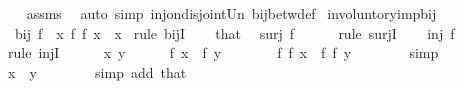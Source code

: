 \begin{isabellebody}
%
\isadelimproof
\ \ %
\endisadelimproof
%
\isatagproof
{}\isamarkupfalse%
\ assms\ \isamarkupfalse%
\ {\isacharparenleft}{\kern0pt}auto\ simp{\isacharcolon}{\kern0pt}\ inj{\isacharunderscore}{\kern0pt}on{\isacharunderscore}{\kern0pt}disjoint{\isacharunderscore}{\kern0pt}Un\ bij{\isacharunderscore}{\kern0pt}betw{\isacharunderscore}{\kern0pt}def{\isacharparenright}{\kern0pt}%
\endisatagproof
{\isafoldproof}%
%
\isadelimproof
\isanewline
%
\endisadelimproof
\isanewline
{}\isamarkupfalse%
\ involuntory{\isacharunderscore}{\kern0pt}imp{\isacharunderscore}{\kern0pt}bij{\isacharcolon}{\kern0pt}\isanewline
\ \ {\isacartoucheopen}bij\ f{\isacartoucheclose}\ \ {\isacartoucheopen}{\isasymAnd}x{\isachardot}{\kern0pt}\ f\ {\isacharparenleft}{\kern0pt}f\ x{\isacharparenright}{\kern0pt}\ {\isacharequal}{\kern0pt}\ x{\isacartoucheclose}\isanewline
%
\isadelimproof
%
\endisadelimproof
%
\isatagproof
{}\isamarkupfalse%
\ {\isacharparenleft}{\kern0pt}rule\ bijI{\isacharparenright}{\kern0pt}\isanewline
\ \ \isamarkupfalse%
\ that\ \isamarkupfalse%
\ {\isacartoucheopen}surj\ f{\isacartoucheclose}\isanewline
\ \ \ \ \isamarkupfalse%
\ {\isacharparenleft}{\kern0pt}rule\ surjI{\isacharparenright}{\kern0pt}\isanewline
\ \ \isamarkupfalse%
\ {\isacartoucheopen}inj\ f{\isacartoucheclose}\isanewline
\ \ \isamarkupfalse%
\ {\isacharparenleft}{\kern0pt}rule\ injI{\isacharparenright}{\kern0pt}\isanewline
\ \ \ \ \isamarkupfalse%
\ x\ y\isanewline
\ \ \ \ \isamarkupfalse%
\ {\isacartoucheopen}f\ x\ {\isacharequal}{\kern0pt}\ f\ y{\isacartoucheclose}\isanewline
\ \ \ \ \isamarkupfalse%
\ \isamarkupfalse%
\ {\isacartoucheopen}f\ {\isacharparenleft}{\kern0pt}f\ x{\isacharparenright}{\kern0pt}\ {\isacharequal}{\kern0pt}\ f\ {\isacharparenleft}{\kern0pt}f\ y{\isacharparenright}{\kern0pt}{\isacartoucheclose}\isanewline
\ \ \ \ \ \ \isamarkupfalse%
\ simp\isanewline
\ \ \ \ \isamarkupfalse%
\ \isamarkupfalse%
\ {\isacartoucheopen}x\ {\isacharequal}{\kern0pt}\ y{\isacartoucheclose}\isanewline
\ \ \ \ \ \ \isamarkupfalse%
\ {\isacharparenleft}{\kern0pt}simp\ add{\isacharcolon}{\kern0pt}\ that{\isacharparenright}{\kern0pt}\isanewline
\ \ \isamarkupfalse%
\isanewline
{}\isamarkupfalse%
%
\endisatagproof
{\isafoldproof}%
%
\isadelimproof
%
\endisadelimproof
%
\isadelimdocument

\end{isabellebody}
